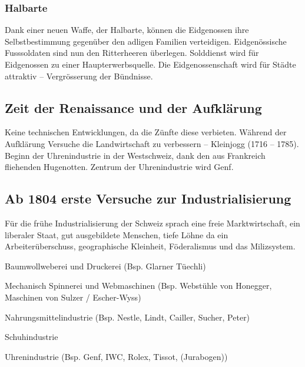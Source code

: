 \documentclass[10pt, openright=true]{scrartcl}
\begin{document}
\subsubsection{Halbarte}
Dank einer neuen Waffe, der Halbarte, können die Eidgenossen ihre Selbstbestimmung gegenüber den adligen Familien verteidigen. Eidgenössische Fusssoldaten sind nun den Ritterheeren überlegen. Solddienst wird für Eidgenossen zu einer Haupterwerbsquelle. Die Eidgenossenschaft wird für Städte attraktiv – Vergrösserung der Bündnisse. \vspace{-0.5cm}
\subsection{Zeit der Renaissance und der Aufklärung}
Keine technischen Entwicklungen, da die Zünfte diese verbieten. Während der Aufklärung Versuche die Landwirtschaft zu verbessern – Kleinjogg (1716 – 1785). Beginn der Uhrenindustrie in der Westschweiz, dank den aus Frankreich fliehenden Hugenotten. Zentrum der Uhrenindustrie wird Genf. \vspace{-0.5cm}
\subsection{Ab 1804 erste Versuche zur Industrialisierung}
Für die frühe Industrialisierung der Schweiz sprach eine freie Marktwirtschaft, ein liberaler Staat, gut ausgebildete Menschen, tiefe Löhne da ein Arbeiterüberschuss, geographische Kleinheit, Föderalismus und das Milizsystem.
\begin{citemize}
\item Baumwollweberei und Druckerei (Bsp. Glarner Tüechli)
\item Mechanisch Spinnerei und Webmaschinen (Bsp. Webstühle von Honegger, Maschinen von Sulzer / Escher-Wyss)
\item Nahrungsmittelindustrie (Bsp. Nestle, Lindt, Cailler, Sucher, Peter)
\item Schuhindustrie
\item Uhrenindustrie (Bsp. Genf, IWC, Rolex, Tissot, (Jurabogen))
\end{citemize} \vspace{-0.5cm}
\end{document}
